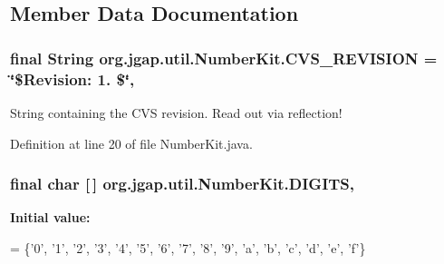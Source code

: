 \subsection{Member Data Documentation}
\hypertarget{classorg_1_1jgap_1_1util_1_1_number_kit_a1071e9c45e560423d3a154529438f130}{
\subsubsection[{C\-V\-S\-\_\-\-R\-E\-V\-I\-S\-I\-O\-N}]{\setlength{\rightskip}{0pt plus 5cm}final String org.\-jgap.\-util.\-Number\-Kit.\-C\-V\-S\-\_\-\-R\-E\-V\-I\-S\-I\-O\-N = \char`\"{}\$Revision\-: 1. \$\char`\"{}\hspace{0.3cm}{\ttfamily [static]}, {\ttfamily [private]}}}\label{classorg_1_1jgap_1_1util_1_1_number_kit_a1071e9c45e560423d3a154529438f130}
String containing the C\-V\-S revision. Read out via reflection! 

Definition at line 20 of file Number\-Kit.\-java.

\hypertarget{classorg_1_1jgap_1_1util_1_1_number_kit_aa884d66408e1c4589dfa2badaa233d0e}{
\subsubsection[{D\-I\-G\-I\-T\-S}]{\setlength{\rightskip}{0pt plus 5cm}final char \mbox{[}$\,$\mbox{]} org.\-jgap.\-util.\-Number\-Kit.\-D\-I\-G\-I\-T\-S\hspace{0.3cm}{\ttfamily [static]}, {\ttfamily [private]}}}\label{classorg_1_1jgap_1_1util_1_1_number_kit_aa884d66408e1c4589dfa2badaa233d0e}
{\bfseries Initial value\-:}
\begin{DoxyCode}
= \{\textcolor{charliteral}{'0'}, \textcolor{charliteral}{'1'}, \textcolor{charliteral}{'2'}, \textcolor{charliteral}{'3'}, \textcolor{charliteral}{'4'}, \textcolor{charliteral}{'5'}, \textcolor{charliteral}{'6'},
      \textcolor{charliteral}{'7'}, \textcolor{charliteral}{'8'}, \textcolor{charliteral}{'9'}, \textcolor{charliteral}{'a'}, \textcolor{charliteral}{'b'}, \textcolor{charliteral}{'c'}, \textcolor{charliteral}{'d'}, \textcolor{charliteral}{'e'}, \textcolor{charliteral}{'f'}\}
\end{DoxyCode}



